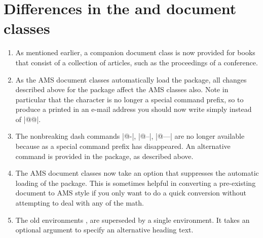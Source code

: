 \documentclass{amsdtx}
\begin{document}
\section{Differences in the  and  document
classes}

\begin{enumerate}

\item As mentioned earlier, a companion document class  is
now provided for books that consist of a collection of articles, such as
the proceedings of a conference.

\item As the AMS document classes automatically load the 
package, all changes described above for the  package
affect the AMS classes also. Note in particular that the \qc{\@}
character is no longer a special command prefix, so to produce a printed
\qc{\@} in an e-mail address you should now write simply \qc{\@} instead
of |@@|.

\item The nonbreaking dash commands |@-|, |@--|, |@---| are no longer
available because \qc{\@} as a special command prefix has disappeared.
An alternative  command is provided in the 
package, as described above.

\item The AMS document classes now take an option  that
suppresses the automatic loading of the  package. This is
sometimes helpful in converting a pre-existing document to AMS style if
you only want to do a quick conversion without attempting to
deal with any of the math.

\item The old environments ,  are superseded by a
single  environment. It takes an optional argument to specify
an alternative heading text.


\end{enumerate}
\end{document}
